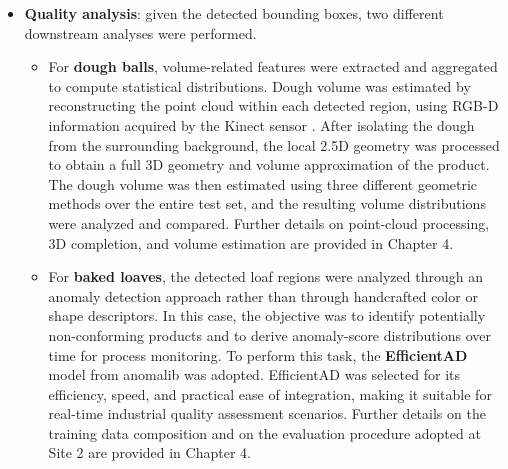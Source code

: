 \begin{itemize}
  \item \textbf{Quality analysis}: given the detected bounding boxes, two different downstream analyses were performed.
  \begin{itemize}
    \item For \textbf{dough balls}, volume-related features were extracted and aggregated to compute statistical distributions. Dough volume was estimated by reconstructing the point cloud within each detected region, using RGB-D information acquired by the Kinect sensor \cite{microsoft_azure_nodate}. After isolating the dough from the surrounding background, the local 2.5D geometry was processed to obtain a full 3D geometry and volume approximation of the product. The dough volume was then estimated using three different geometric methods over the entire test set, and the resulting volume distributions were analyzed and compared. Further details on point-cloud processing, 3D completion, and volume estimation are provided in Chapter 4.

    \item For \textbf{baked loaves}, the detected loaf regions were analyzed through an anomaly detection approach rather than through handcrafted color or shape descriptors. In this case, the objective was to identify potentially non-conforming products and to derive anomaly-score distributions over time for process monitoring. To perform this task, the \textbf{EfficientAD} \cite{batzner_efficientad_2024} model from anomalib \cite{akcay_anomalib_2022} was adopted. EfficientAD was selected for its efficiency, speed, and practical ease of integration, making it suitable for real-time industrial quality assessment scenarios. Further details on the training data composition and on the evaluation procedure adopted at Site 2 are provided in Chapter 4.
  \end{itemize}
\end{itemize}

